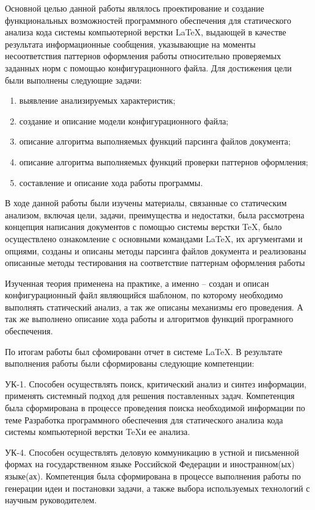 \conclusion
Основной целью данной работы являлось проектирование и создание функциональных возможностей программного обеспечения для статического анализа кода системы компьютерной верстки \LaTeX, выдающей в качестве результата информационные сообщения, указывающие на  моменты несоответствия паттернов оформления работы относительно проверяемых заданных норм с помощью конфигурационного файла. Для достижения цели были выполнены следующие задачи:
\begin{enumerate}    
    \item выявление анализируемых характеристик;    
    \item создание и описание модели конфигурационного файла;    
    \item описание алгоритма выполняемых функций парсинга файлов документа; 
    \item описание алгоритма выполняемых функций проверки паттернов оформления;    
    \item составление и описание хода работы программы.
\end{enumerate}

В ходе данной работы были изучены материалы, связанные со статическим анализом, включая цели, задачи, преимущества и недостатки, была рассмотрена концепция написания документов с помощью системы верстки \TeX, было осуществлено ознакомление с основными командами \LaTeX, их аргументами и опциями, созданы и описаны методы парсинга файлов документа и реализованы описанные методы тестирования на соответствие паттернам оформления работы 

Изученная теория применена на практике, а именно – создан и описан конфигурационный файл являющийся шаблоном, по которому необходимо выполнять статический анализ, а так же описаны механизмы его проведения. А так же выполнено описание хода работы и алгоритмов функций програмного обеспечения.

По итогам работы был сфомированн отчет в системе \LaTeX.
В результате выполнения работы были сформированы следующие компетенции: 


УК-1. Способен осуществлять поиск, критический анализ и синтез информации, применять системный подход для решения поставленных задач.
Компетенция была сформирована в процессе проведения поиска необходимой информации по теме \guillemotleft Разработка программного обеспечения для статического анализа кода системы компьютерной верстки TeX\guillemotright и ее анализа.


УК-4. Способен осуществлять деловую коммуникацию в устной и письменной формах на государственном языке Российской Федерации и иностранном(ых) языке(ах).
Компетенция была сформирована в процессе выполнения работы по генерации идеи и постановки задачи, а также выбора используемых технологий с научным руководителем.


